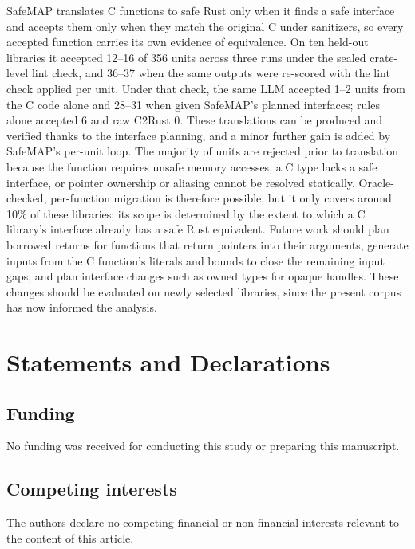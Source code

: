 \documentclass[pdflatex,sn-basic]{sn-jnl}
\newcommand{\tool}{SafeMAP\xspace}
\begin{document}
\tool translates C functions to safe Rust only when it finds a safe interface
and accepts them only when they match the original C under sanitizers, so
every accepted function carries its own evidence of equivalence. On ten
held-out libraries it accepted 12--16 of 356 units across three runs under
the sealed crate-level lint check, and 36--37 when the same outputs were
re-scored with the lint check applied per unit. Under that check, the same LLM
accepted 1--2 units from the C code alone and 28--31 when given \tool's
planned interfaces; rules alone accepted 6 and raw C2Rust 0. These translations can 
be produced and verified thanks to the interface planning, and a minor further gain 
is added by \tool's per-unit loop. The majority of units are rejected prior to translation 
because the function requires unsafe memory accesses, a C type lacks a safe interface, or pointer ownership or 
aliasing cannot be resolved statically. Oracle-checked, per-function migration is therefore possible, 
but it only covers around 10\% of these libraries; its scope is determined by the extent to which a 
C library's interface already has a safe Rust equivalent. Future work should plan borrowed returns for functions that
return pointers into their arguments, generate inputs from the C function's
literals and bounds to close the remaining input gaps, and plan interface
changes such as owned types for opaque handles. These changes should be
evaluated on newly selected libraries, since the present corpus has now
informed the analysis.

\section*{Statements and Declarations}

\subsection*{Funding}
No funding was received for conducting this study or preparing this manuscript.

\subsection*{Competing interests}
The authors declare no competing financial or non-financial interests relevant
to the content of this article.
\end{document}
